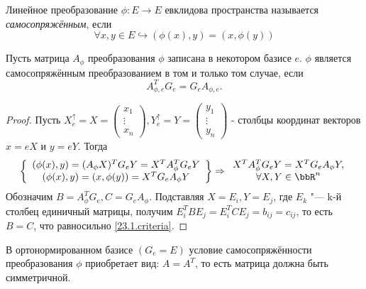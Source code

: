 \begin{defn}
  Линейное преобразование $\phi: E \rightarrow E$ евклидова пространства называется \textit{самосопряжённым}, если
  \begin{equation}\label{23.1.selfadjoint}
  \forall x,y \in E \hookrightarrow (\phi(x),y)=(x,\phi(y))
  \end{equation}
\end{defn}
  \begin{thm} Пусть матрица $A_\phi$ преобразования $\phi$ записана в некотором базисе $e$. $\phi$ является самосопряжённым преобразованием в том и только том случае, если
  \begin{equation}\label{23.1.criteria}
  A^T_{\phi,e}G_e=G_eA_{\phi,e}.
  \end{equation}  
  \end{thm}    
  \begin{proof}
  Пусть $X_e^\uparrow=X=
  \begin{pmatrix}
  x_1 \\ \vdots \\ x_n
  \end{pmatrix},Y_e^\uparrow=Y=
  \begin{pmatrix}
  y_1 \\ \vdots \\ y_n
  \end{pmatrix}$ - столбцы координат векторов $x=eX$ и $y=eY$. Тогда
  \begin{equation*}
  \left\lbrace \begin{array}{crl}
    (\phi(x),y)=(A_\phi X)^TG_eY=X^TA_\phi^TG_eY \\
    (\phi(x),y)=(x,\phi(y))=X^TG_eA_\phi Y \\
    \end{array}\right\rbrace \Rightarrow  \begin{array}{crl}
    X^TA_\phi^TG_eY=X^TG_eA_\phi Y, \\ \forall X,Y\in \bbR^n
  \end{array}     
  \end{equation*}   
  Обозначим $B=A_\phi^TG_e, C=G_eA_\phi$. Подставляя $X=E_i, Y=E_j$, где $E_k$ "--- k-й столбец единичный матрицы, получим $E_i^TBE_j=E_i^TCE_j=b_{ij}=c_{ij}$, то есть $B=C$, что равносильно \eqref{23.1.criteria}.
  \end{proof}
  \begin{cons}
  В ортонормированном базисе $(G_e=E)$ условие самосопряжённости преобразования $\phi$ приобретает вид: $A=A^T$, то есть матрица должна быть симметричной.
  \end{cons}

